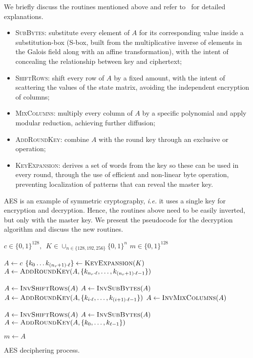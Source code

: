 \documentclass{../sftex/sftex}
\newcommand{\binwds}[1]{\{0, 1\}^{#1}}
\begin{document}
We briefly discuss the routines mentioned above and refer
to~\cite{Daemen:book:2002} for detailed explanations.

\begin{itemize}
  \item \textsc{SubBytes}: substitute every element of $A$ for its
      corresponding value inside a substitution-box (S-box, built from the
        multiplicative inverse of elements in the Galois field along with an
        affine transformation), with the intent of concealing the relationship
        between key and ciphertext;
  \item \textsc{ShiftRows}: shift every row of $A$ by a fixed amount, with the
      intent of scattering the values of the state matrix, avoiding the
        independent encryption of columns;
  \item \textsc{MixColumns}: multiply every column of $A$ by a specific
      polynomial and apply modular reduction, achieving further diffusion;
  \item \textsc{AddRoundKey}: combine $A$ with the round key through an
      exclusive or operation;
  \item \textsc{KeyExpansion}: derives a set of words from the key so these can
      be used in every round, through the use of efficient and non-linear byte
        operation, preventing localization of patterns that can reveal the
        master key.
\end{itemize}

AES is an example of symmetric cryptography, \emph{i.e.} it uses a single key
for encryption and decryption. Hence, the routines above need to be easily
inverted, but only with the master key. We present the pseudocode for the
decryption algorithm and discuss the new routines.

\begin{algorithm}
  \begin{algorithmic}
    \REQUIRE{}  $c \in \binwds{128}, \enspace
      K \in \cup_{n \in \{128, 192, 256\}} \binwds{n}$
    \ENSURE{}  $m \in \binwds{128}$ 

    \STATE{}  $A \leftarrow c$
    \STATE{}  $\{k_{0} \dots k_{(n_{r} + 1) \cdot \ell}\}
      \leftarrow \textsc{KeyExpansion}(K)$
    \STATE{}  $A \leftarrow \textsc{AddRoundKey}(A,
      \{k_{n_{r} \cdot \ell}, \dots, k_{(n_{r} + 1) \cdot \ell - 1}\})$

      \STATE{}  $A \leftarrow \textsc{InvShiftRows}(A)$
      \STATE{}  $A \leftarrow \textsc{InvSubBytes}(A)$
      \STATE{}  $A \leftarrow \textsc{AddRoundKey}(A,
        \{k_{i \cdot \ell}, \dots, k_{(i + 1) \cdot \ell - 1}\})$
      \STATE{}  $A \leftarrow \textsc{InvMixColumns}(A)$
    \ENDFOR{}

    \STATE{}  $A \leftarrow \textsc{InvShiftRows}(A)$
    \STATE{}  $A \leftarrow \textsc{InvSubBytes}(A)$
    \STATE{}  $A \leftarrow \textsc{AddRoundKey}(A,
      \{k_{0}, \dots, k_{\ell - 1}\})$

    \STATE{}  $m \leftarrow A$
  \end{algorithmic}
  \caption{AES deciphering process.}\label{alg:aesdecrypt}
\end{algorithm}
\end{document}
